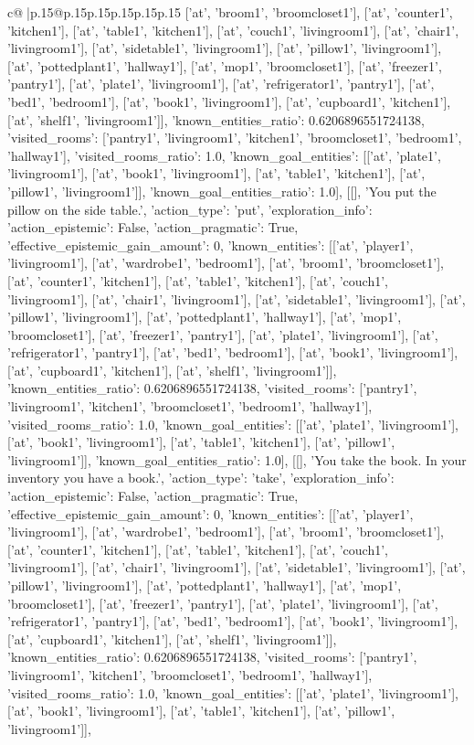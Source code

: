 \documentclass{article}
\begin{document}
{\begin{supertabular}{c@{$\;$}|p{.15\linewidth}@{}p{.15\linewidth}p{.15\linewidth}p{.15\linewidth}p{.15\linewidth}p{.15\linewidth}}
{{{['at', 'broom1', 'broomcloset1'], ['at', 'counter1', 'kitchen1'], ['at', 'table1', 'kitchen1'], ['at', 'couch1', 'livingroom1'], ['at', 'chair1', 'livingroom1'], ['at', 'sidetable1', 'livingroom1'], ['at', 'pillow1', 'livingroom1'], ['at', 'pottedplant1', 'hallway1'], ['at', 'mop1', 'broomcloset1'], ['at', 'freezer1', 'pantry1'], ['at', 'plate1', 'livingroom1'], ['at', 'refrigerator1', 'pantry1'], ['at', 'bed1', 'bedroom1'], ['at', 'book1', 'livingroom1'], ['at', 'cupboard1', 'kitchen1'], ['at', 'shelf1', 'livingroom1']], 'known_entities_ratio': 0.6206896551724138, 'visited_rooms': ['pantry1', 'livingroom1', 'kitchen1', 'broomcloset1', 'bedroom1', 'hallway1'], 'visited_rooms_ratio': 1.0, 'known_goal_entities': [['at', 'plate1', 'livingroom1'], ['at', 'book1', 'livingroom1'], ['at', 'table1', 'kitchen1'], ['at', 'pillow1', 'livingroom1']], 'known_goal_entities_ratio': 1.0}}], [[], 'You put the pillow on the side table.', {'action_type': 'put', 'exploration_info': {'action_epistemic': False, 'action_pragmatic': True, 'effective_epistemic_gain_amount': 0, 'known_entities': [['at', 'player1', 'livingroom1'], ['at', 'wardrobe1', 'bedroom1'], ['at', 'broom1', 'broomcloset1'], ['at', 'counter1', 'kitchen1'], ['at', 'table1', 'kitchen1'], ['at', 'couch1', 'livingroom1'], ['at', 'chair1', 'livingroom1'], ['at', 'sidetable1', 'livingroom1'], ['at', 'pillow1', 'livingroom1'], ['at', 'pottedplant1', 'hallway1'], ['at', 'mop1', 'broomcloset1'], ['at', 'freezer1', 'pantry1'], ['at', 'plate1', 'livingroom1'], ['at', 'refrigerator1', 'pantry1'], ['at', 'bed1', 'bedroom1'], ['at', 'book1', 'livingroom1'], ['at', 'cupboard1', 'kitchen1'], ['at', 'shelf1', 'livingroom1']], 'known_entities_ratio': 0.6206896551724138, 'visited_rooms': ['pantry1', 'livingroom1', 'kitchen1', 'broomcloset1', 'bedroom1', 'hallway1'], 'visited_rooms_ratio': 1.0, 'known_goal_entities': [['at', 'plate1', 'livingroom1'], ['at', 'book1', 'livingroom1'], ['at', 'table1', 'kitchen1'], ['at', 'pillow1', 'livingroom1']], 'known_goal_entities_ratio': 1.0}}], [[], 'You take the book. In your inventory you have a book.', {'action_type': 'take', 'exploration_info': {'action_epistemic': False, 'action_pragmatic': True, 'effective_epistemic_gain_amount': 0, 'known_entities': [['at', 'player1', 'livingroom1'], ['at', 'wardrobe1', 'bedroom1'], ['at', 'broom1', 'broomcloset1'], ['at', 'counter1', 'kitchen1'], ['at', 'table1', 'kitchen1'], ['at', 'couch1', 'livingroom1'], ['at', 'chair1', 'livingroom1'], ['at', 'sidetable1', 'livingroom1'], ['at', 'pillow1', 'livingroom1'], ['at', 'pottedplant1', 'hallway1'], ['at', 'mop1', 'broomcloset1'], ['at', 'freezer1', 'pantry1'], ['at', 'plate1', 'livingroom1'], ['at', 'refrigerator1', 'pantry1'], ['at', 'bed1', 'bedroom1'], ['at', 'book1', 'livingroom1'], ['at', 'cupboard1', 'kitchen1'], ['at', 'shelf1', 'livingroom1']], 'known_entities_ratio': 0.6206896551724138, 'visited_rooms': ['pantry1', 'livingroom1', 'kitchen1', 'broomcloset1', 'bedroom1', 'hallway1'], 'visited_rooms_ratio': 1.0, 'known_goal_entities': [['at', 'plate1', 'livingroom1'], ['at', 'book1', 'livingroom1'], ['at', 'table1', 'kitchen1'], ['at', 'pillow1', 'livingroom1']], }}}
\end{supertabular}}
\end{document}
